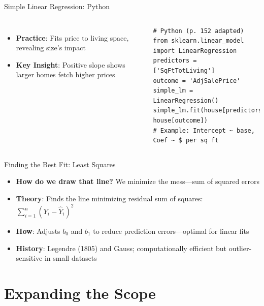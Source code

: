 \documentclass{beamer}
\begin{document}
	\begin{frame}[fragile]{Simple Linear Regression: Python}
		\lstset{language=Python}
		\begin{columns}
			\begin{itemize}
				\item \textbf{Practice}: Fits price to living space, revealing size’s impact
				\item \textbf{Key Insight}: Positive slope shows larger homes fetch higher prices
			\end{itemize}
			\begin{lstlisting}
# Python (p. 152 adapted)
from sklearn.linear_model import LinearRegression
predictors = ['SqFtTotLiving']
outcome = 'AdjSalePrice'
simple_lm = LinearRegression()
simple_lm.fit(house[predictors], house[outcome])
# Example: Intercept ~ base, Coef ~ $ per sq ft
			\end{lstlisting}

		\end{columns}
	\end{frame}
	
	\begin{frame}{Finding the Best Fit: Least Squares}
			\begin{itemize}
				 \item \textbf{How do we draw that line?} We minimize the mess—sum of squared errors
				\item \textbf{Theory}: Finds the line minimizing residual sum of squares: $\sum_{i=1}^n (Y_i - \hat{Y}_i)^2$
				\item \textbf{How}: Adjusts $b_0$ and $b_1$ to reduce prediction errors—optimal for linear fits
				\item \textbf{History}: Legendre (1805) and Gauss; computationally efficient but outlier-sensitive in small datasets
			\end{itemize}
		\end{frame}
		
	


	
	
	\section{Expanding the Scope}
	
\end{document}

